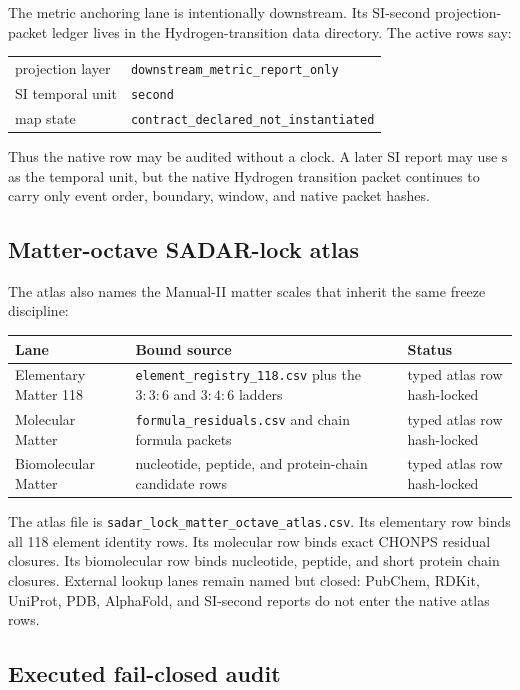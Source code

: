 The metric anchoring lane is intentionally downstream.  Its SI-second
projection-packet ledger lives in the Hydrogen-transition data directory.  The
active rows say:
\begin{center}
\begin{tabular}{@{}ll@{}}
projection layer & \texttt{downstream\_metric\_report\_only} \\
SI temporal unit & \texttt{second} \\
map state & \texttt{contract\_declared\_not\_instantiated}
\end{tabular}
\end{center}
Thus the native row may be audited without a clock.  A later SI report may use
\(\mathrm{s}\) as the temporal unit, but the native Hydrogen transition packet
continues to carry only event order, boundary, window, and native packet hashes.

\subsection{Matter-octave SADAR-lock atlas}

The atlas also names the Manual-II matter scales that inherit the same freeze
discipline:
\begin{center}
\begin{tabularx}{\linewidth}{@{}lXl@{}}
\toprule
Lane & Bound source & Status \\
\midrule
Elementary Matter 118 & \texttt{element\_registry\_118.csv} plus the
\(3{:}3{:}6\) and \(3{:}4{:}6\) ladders & typed atlas row hash-locked \\
Molecular Matter & \texttt{formula\_residuals.csv} and chain formula packets &
typed atlas row hash-locked \\
Biomolecular Matter & nucleotide, peptide, and protein-chain candidate rows &
typed atlas row hash-locked \\
\bottomrule
\end{tabularx}
\end{center}
The atlas file is
\texttt{sadar\_lock\_matter\_octave\_atlas.csv}.  Its elementary row binds all
118 element identity rows.  Its molecular row binds exact CHONPS residual
closures.  Its biomolecular row binds nucleotide, peptide, and short protein
chain closures.  External lookup lanes remain named but closed: PubChem, RDKit,
UniProt, PDB, AlphaFold, and SI-second reports do not enter the native atlas
rows.

\subsection{Executed fail-closed audit}

